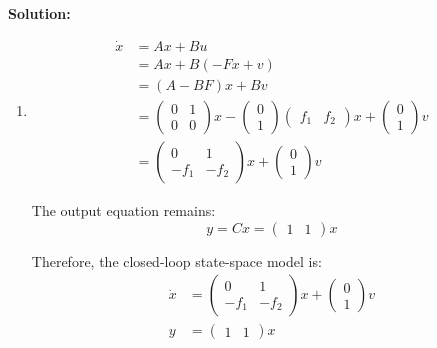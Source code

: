\documentclass[12pt]{article}
\newenvironment{solution}{
    \textbf{Solution:}
    
}{
    
    \vspace{2em}
}
\begin{document}
\begin{solution}
    \begin{enumerate}[label=(\alph*)]
        \item
        \[
            \begin{aligned}
                \dot{x} &= Ax + Bu \\
                &= Ax + B(-Fx + v) \\
                &= (A-BF)x + Bv \\
                &= \begin{pmatrix}
                    0 & 1 \\
                    0 & 0
                \end{pmatrix}x - \begin{pmatrix}
                    0 \\
                    1
                \end{pmatrix}
                \begin{pmatrix}
                    f_1 & f_2
                \end{pmatrix}x + \begin{pmatrix}
                    0 \\
                    1
                \end{pmatrix}v \\
                &= \begin{pmatrix}
                    0 & 1 \\
                    -f_1 & -f_2
                \end{pmatrix}x + \begin{pmatrix}
                    0 \\
                    1
                \end{pmatrix}v
            \end{aligned}
        \]
        
        The output equation remains:
        \[
            y = Cx = \begin{pmatrix} 1 & 1 \end{pmatrix}x
        \]
        
        Therefore, the closed-loop state-space model is:
        \[
            \begin{aligned}
                \dot{x} &= \begin{pmatrix}
                    0 & 1 \\
                    -f_1 & -f_2
                \end{pmatrix}x + \begin{pmatrix}
                    0 \\
                    1
                \end{pmatrix}v \\
                y &= \begin{pmatrix} 1 & 1 \end{pmatrix}x
            \end{aligned}
        \]


\end{enumerate}
\end{solution}
\end{document}
